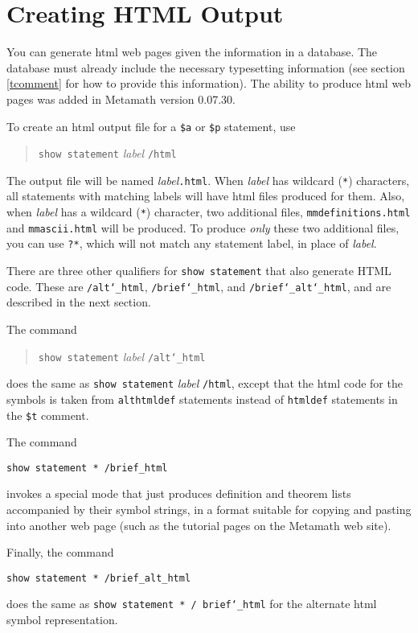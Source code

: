 \section{Creating HTML Output}\label{htmlout}

You can generate {\sc html} web pages given the
information in a database.
The database must already include the necessary typesetting information
(see section \ref{tcomment} for how to provide this information).
The ability to produce {\sc html} web pages was added in Metamath version
0.07.30.

To create an {\sc html} output file for a \texttt{\$a} or \texttt{\$p}
statement, use
\begin{quote}
    \texttt{show statement} {\em label} \texttt{/html}
\end{quote}
The output file will be named {\em label}\texttt{.html}.  When {\em
label} has wildcard (\texttt{*}) characters, all statements with
matching labels will have {\sc html} files produced for them.  Also,
when {\em label} has a wildcard (\texttt{*}) character, two additional
files, \texttt{mmdefinitions.html} and \texttt{mmascii.html} will be
produced.  To produce {\em only} these two additional files, you can use
\texttt{?*}, which will not match any statement label, in place of {\em
label}.

There are three other qualifiers for \texttt{show statement} that also
generate {\sc HTML} code.  These are \texttt{/alt{\char`\_}html},
\texttt{/brief{\char`\_}html}, and
\texttt{/brief{\char`\_}alt{\char`\_}html}, and are described in the
next section.

The command
\begin{quote}
    \texttt{show statement} {\em label} \texttt{/alt{\char`\_}html}
\end{quote}
does the same as \texttt{show statement} {\em label} \texttt{/html},
except that the {\sc html} code for the symbols is taken from
\texttt{althtmldef} statements instead of \texttt{htmldef} statements in
the \texttt{\$t} comment.

The command
\begin{verbatim}
show statement * /brief_html
\end{verbatim}
invokes a special mode that just produces definition and theorem lists
accompanied by their symbol strings, in a format suitable for copying and
pasting into another web page (such as the tutorial pages on the
Metamath web site).

Finally, the command
\begin{verbatim}
show statement * /brief_alt_html
\end{verbatim}
does the same as \texttt{show statement * / brief{\char`\_}html}
for the alternate {\sc html}
symbol representation.

